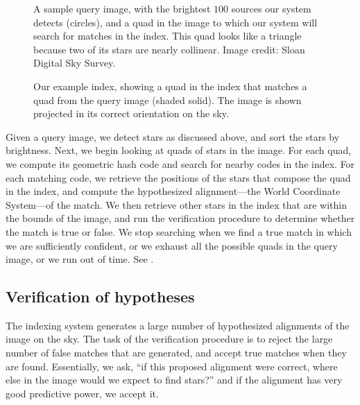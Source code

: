 \begin{figure}[htp]
\begin{center}
\setlength{\fboxsep}{0.5pt}
\end{center}
\caption{A sample query image, with the brightest
$100$ sources our system detects (circles), and a quad in the image to
which our system will search for matches in the index.  This quad
looks like a triangle because two of its stars are nearly collinear.
Image credit: Sloan Digital Sky Survey.
\label{fig:imagequad}}
\end{figure}


\begin{figure}[htp]
\begin{center}
\setlength{\fboxsep}{0.5pt}
\end{center}
\caption{Our example index, showing a quad in the index that matches 
a quad from the query image (shaded solid).  The image is shown
projected in its correct orientation on the sky.
\label{fig:quadmatch}}
\end{figure}


Given a query image, we detect stars as discussed above, and sort the
stars by brightness.  Next, we begin looking at quads of stars in the
image.  For each quad, we compute its geometric hash code and search
for nearby codes in the index.  For each matching code, we retrieve
the positions of the stars that compose the quad in the index, and
compute the hypothesized alignment---the World Coordinate System---of
the match.  We then retrieve other stars in the index that are within
the bounds of the image, and run the verification procedure to
determine whether the match is true or false.  We stop searching when
we find a true match in which we are sufficiently confident, or we
exhaust all the possible quads in the query image, or we run out of
time.  See .




\subsection{Verification of hypotheses}


The indexing system generates a large number of hypothesized
alignments of the image on the sky.  The task of the verification
procedure is to reject the large number of false matches that are
generated, and accept true matches when they are found.  Essentially,
we ask, ``if this proposed alignment were correct, where else in the
image would we expect to find stars?'' and if the alignment has very
good predictive power, we accept it.



